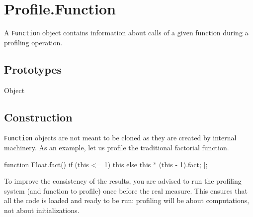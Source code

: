 
\section{Profile.Function}

A \lstinline|Function| object contains information about calls of a
given function during a profiling operation.

\subsection{Prototypes}

\begin{refObjects}
\item[Object]
\end{refObjects}

\subsection{Construction}

\lstinline|Function| objects are not meant to be cloned as they are
created by  internal machinery.  As an example, let
us profile the traditional factorial function.

\begin{urbiscript}
function Float.fact()
{
  if (this <= 1)
    this
  else
    this * (this - 1).fact;
}|;
\end{urbiscript}

To improve the consistency of the results, you are advised to run the
profiling system (and function to profile) once before the real measure.
This ensures that all the code is loaded and ready to be run: profiling will
be about computations, not about initializations.

